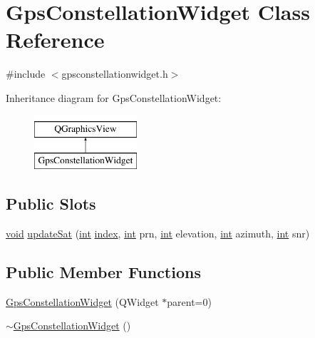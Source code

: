 \hypertarget{class_gps_constellation_widget}{\section{Gps\-Constellation\-Widget Class Reference}
\label{class_gps_constellation_widget}
}


{\ttfamily \#include $<$gpsconstellationwidget.\-h$>$}

Inheritance diagram for Gps\-Constellation\-Widget\-:\begin{figure}[H]
\begin{center}
\leavevmode
\includegraphics[height=2.000000cm]{class_gps_constellation_widget}
\end{center}
\end{figure}
\subsection*{Public Slots}
\begin{DoxyCompactItemize}
\item 
\hyperlink{group___u_a_v_objects_plugin_ga444cf2ff3f0ecbe028adce838d373f5c}{void} \hyperlink{group___g_p_s_gadget_plugin_gaa995e2d09a888698ad0aae9ba0a91ebf}{update\-Sat} (\hyperlink{ioapi_8h_a787fa3cf048117ba7123753c1e74fcd6}{int} \hyperlink{glext_8h_ab47dd9958bcadea08866b42bf358e95e}{index}, \hyperlink{ioapi_8h_a787fa3cf048117ba7123753c1e74fcd6}{int} prn, \hyperlink{ioapi_8h_a787fa3cf048117ba7123753c1e74fcd6}{int} elevation, \hyperlink{ioapi_8h_a787fa3cf048117ba7123753c1e74fcd6}{int} azimuth, \hyperlink{ioapi_8h_a787fa3cf048117ba7123753c1e74fcd6}{int} snr)
\end{DoxyCompactItemize}
\subsection*{Public Member Functions}
\begin{DoxyCompactItemize}
\item 
\hyperlink{group___g_p_s_gadget_plugin_gaa8d0d3435153893cbf167a1e5820d979}{Gps\-Constellation\-Widget} (Q\-Widget $\ast$parent=0)
\item 
\hyperlink{group___g_p_s_gadget_plugin_gaa4c124f26c71bf318147e079011fe137}{$\sim$\-Gps\-Constellation\-Widget} ()
\end{DoxyCompactItemize}
